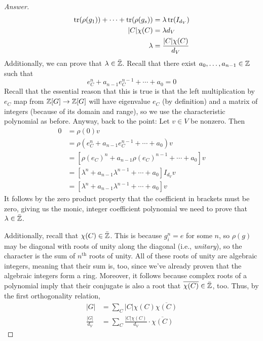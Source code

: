 \documentclass[../notes.tex]{subfiles}
\begin{document}
\begin{itemize}
\begin{proof}[Answer]
\begin{align*}
            \tr(\rho(g_1))+\cdots+\tr(\rho(g_s)) &= \lambda\tr(I_{d_V})\\
            |C|\chi(C) &= \lambda d_V\\
            \lambda &= \frac{|C|\chi(C)}{d_V}
        \end{align*}
        Additionally, we can prove that $\lambda\in\bar{\mathbb{Z}}$. Recall that there exist $a_0,\dots,a_{n-1}\in\mathbb{Z}$ such that
        \begin{equation*}
            e_C^n+a_{n-1}e_C^{n-1}+\cdots+a_0 = 0
        \end{equation*}
        Recall that the essential reason that this is true is that the left multiplication by $e_C$ map from $\mathbb{Z}[G]\to\mathbb{Z}[G]$ will have eigenvalue $e_C$ (by definition) and a matrix of integers (because of its domain and range), so we use the characteristic polynomial as before. Anyway, back to the point: Let $v\in V$ be nonzero. Then
        \begin{align*}
            0 &= \rho(0)v\\
            &= \rho(e_C^n+a_{n-1}e_C^{n-1}+\cdots+a_0)v\\
            &= \left[ \rho(e_C)^n+a_{n-1}\rho(e_C)^{n-1}+\cdots+a_0 \right]v\\
            &= \left[ \lambda^n+a_{n-1}\lambda^{n-1}+\cdots+a_0 \right]I_{d_V}v\\
            &= \left[ \lambda^n+a_{n-1}\lambda^{n-1}+\cdots+a_0 \right]v
        \end{align*}
        It follows by the zero product property that the coefficient in brackets must be zero, giving us the monic, integer coefficient polynomial we need to prove that $\lambda\in\bar{\mathbb{Z}}$.\par
        Additionally, recall that $\chi(C)\in\bar{\mathbb{Z}}$. This is because $g_i^n=e$ for some $n$, so $\rho(g)$ may be diagonal with roots of unity along the diagonal (i.e., \emph{unitary}), so the character is the sum of $n^\text{th}$ roots of unity. All of these roots of unity are algebraic integers, meaning that their sum is, too, since we've already proven that the algebraic integers form a ring. Moreover, it follows because complex roots of a polynomial imply that their conjugate is also a root that $\overline{\chi(C)}\in\bar{\mathbb{Z}}$, too. Thus, by the first orthogonality relation,
        \begin{align*}
            |G| &= \sum_C|C|\chi(C)\overline{\chi(C)}\\
            \frac{|G|}{d_V} &= \sum_C\frac{|C|\chi(C)}{d_V}\cdot\overline{\chi(C)}

\end{align*}
\end{proof}
\end{itemize}
\end{document}
